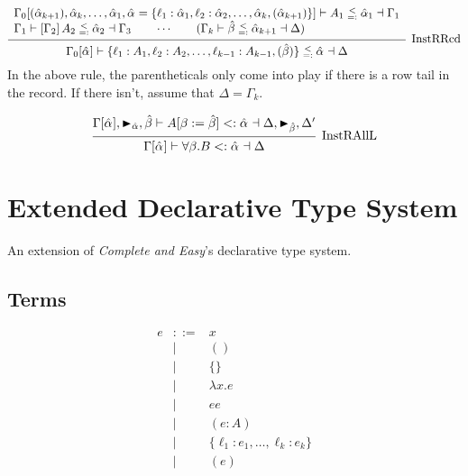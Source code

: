 \documentclass{article}
\newcommand{\rcd}[1]{\{#1\}}
\newcommand{\define}{::=}
\newcommand{\marker}[1]{\RHD_{#1}}
\newcommand{\subsume}{<:}
\newcommand{\instRSymbol}{\;\substack{<\\=:}\;}
\newcommand{\ev}{\hat}
\newcommand{\spc}{\qquad}
\newcommand{\apply}[1]{\left[#1\right]}
\newcommand{\eva}[1][]{\ev \alpha_{#1}}
\newcommand{\evb}{\ev \beta}
\newcommand{\subsumes}[4]{#1 \vdash #2 \subsume #3 \dashv #4}
\newcommand{\instR}[4]{#1 \vdash #2 \instRSymbol #3 \dashv #4}
\newcommand{\deduct}[3][]
{
  \begin{prooftree}
    \hypo{#2}
    \infer1[\text{#1}]{#3}
  \end{prooftree}
}
\begin{document}
\[
  \deduct[InstRRcd]
  {
    \begin{array}{l}
     \instR{\Gamma_0[(\eva[k+1]), \eva[k], \dots, \eva[1], \eva=\{\ell_1 : \eva[1],
      \ell_2 : \eva[2], \dots, \eva[k], (\eva[k+1])\}]}{A_1}{\eva[1]}{\Gamma_1} \\
    \instR{\Gamma_1}{\apply{\Gamma_2} A_2}{\eva[2]}{\Gamma_3} \spc \cdots \spc
     (\instR{\Gamma_k}{\evb}{\eva[k+1]}{\Delta})
  \end{array}
  }
  {\instR{\Gamma_0[\eva]}{\{\ell_1:A_1, \ell_2 : A_2, \dots, \ell_{k-1} : A_{k-1}, (\evb)\}}{\eva}{\Delta}}
\]
In the above rule, the parentheticals only come into play if there is a row tail
in the record. If there isn't, assume that \(\Delta = \Gamma_k\).

\[
  \deduct[InstRAllL]
  { \subsumes{\Gamma[\eva], \marker{\ev\alpha}, \evb}{A[\beta := \evb]}{\eva}{\Delta, \marker{\evb}, \Delta'} }
  { \subsumes{\Gamma[\eva]}{\forall \beta. B}{\eva}{\Delta} }
\]


\section{Extended Declarative Type System}
An extension of \emph{Complete and Easy}'s declarative type system.

\subsection{Terms}

\[
  \begin{array}{lcl}
    e & \define & x \\
      & | & () \\
      & | & \rcd{} \\
      & | & \lambda x. e  \\
      & | & e e \\
      & | & (e : A) \\
      & | & \rcd{\ell_1 : e_1, \dots, \ell_k : e_k} \\
      & | & (e)
  \end{array}
\]
\end{document}
